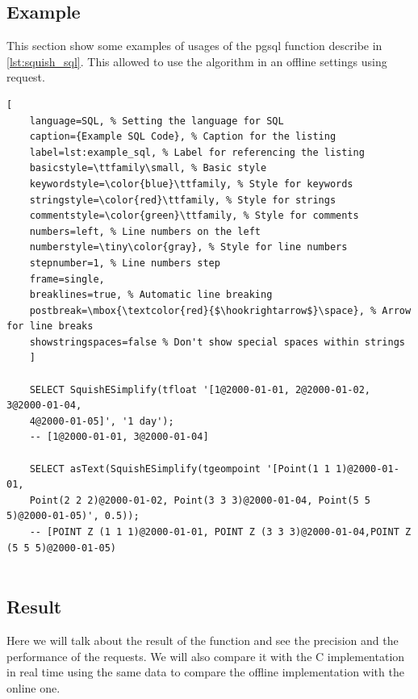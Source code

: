 \documentclass[twoside,12pt, a4paper]{report}
\begin{document}
\subsection{Example}
This section show some examples of usages of the pgsql function describe in \ref{lst:squish_sql}. This allowed to use the algorithm in an offline settings using request. 
\begin{lstlisting}[
	language=SQL, % Setting the language for SQL
	caption={Example SQL Code}, % Caption for the listing
	label=lst:example_sql, % Label for referencing the listing
	basicstyle=\ttfamily\small, % Basic style
	keywordstyle=\color{blue}\ttfamily, % Style for keywords
	stringstyle=\color{red}\ttfamily, % Style for strings
	commentstyle=\color{green}\ttfamily, % Style for comments
	numbers=left, % Line numbers on the left
	numberstyle=\tiny\color{gray}, % Style for line numbers
	stepnumber=1, % Line numbers step
	frame=single,
	breaklines=true, % Automatic line breaking
	postbreak=\mbox{\textcolor{red}{$\hookrightarrow$}\space}, % Arrow for line breaks
	showstringspaces=false % Don't show special spaces within strings
	]
	
	SELECT SquishESimplify(tfloat '[1@2000-01-01, 2@2000-01-02, 3@2000-01-04,
	4@2000-01-05]', '1 day');
	-- [1@2000-01-01, 3@2000-01-04]
	
	SELECT asText(SquishESimplify(tgeompoint '[Point(1 1 1)@2000-01-01,
	Point(2 2 2)@2000-01-02, Point(3 3 3)@2000-01-04, Point(5 5 5)@2000-01-05)', 0.5));
	-- [POINT Z (1 1 1)@2000-01-01, POINT Z (3 3 3)@2000-01-04,POINT Z (5 5 5)@2000-01-05)
	
\end{lstlisting}

\subsection{Result}

Here we will talk about the result of the function and see the precision and the performance of the requests. We will also compare it with the C implementation in real time using the same data to compare the offline implementation with the online one. 
\end{document}
